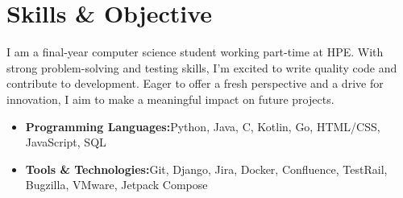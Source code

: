 \documentclass[a4paper,11pt]{article}
\newcommand{\resumeItem}[2]{
  \item{
    \textbf{#1}{\hspace{0.5mm}#2 \vspace{-0.5mm}}
  }
}
\newcommand{\resumeSubItem}[2]{\resumeItem{#1}{#2}\vspace{-4pt}}
\newcommand{\resumeHeadingSkillStart}{\begin{itemize}[leftmargin=*,itemsep=1.7mm, rightmargin=2ex]}
\newcommand{\resumeHeadingSkillEnd}{\end{itemize}\vspace{-2mm}}
\begin{document}
\section{\textbf{Skills \& Objective}}
\vspace{1mm}
\small{
I am a final-year computer science student working part-time at HPE. With strong problem-solving and testing skills, I’m excited to write quality code and contribute to development. Eager to offer a fresh perspective and a drive for innovation, I aim to make a meaningful impact on future projects.
\vspace{1mm}
 \resumeHeadingSkillStart
  \resumeSubItem{Programming Languages:}
    {Python, Java, C, Kotlin, Go, HTML/CSS, JavaScript, SQL}
  \resumeSubItem{Tools \& Technologies:}
    {Git, Django, Jira, Docker, Confluence, TestRail, Bugzilla, VMware, Jetpack Compose }
 \resumeHeadingSkillEnd


 

}
\end{document}
